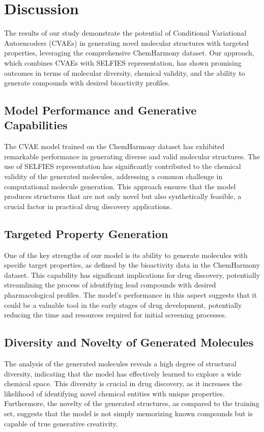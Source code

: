 \section{Discussion}

The results of our study demonstrate the potential of Conditional Variational Autoencoders (CVAEs) in generating novel molecular structures with targeted properties, leveraging the comprehensive ChemHarmony dataset. Our approach, which combines CVAEs with SELFIES representation, has shown promising outcomes in terms of molecular diversity, chemical validity, and the ability to generate compounds with desired bioactivity profiles.

\subsection{Model Performance and Generative Capabilities}

The CVAE model trained on the ChemHarmony dataset has exhibited remarkable performance in generating diverse and valid molecular structures. The use of SELFIES representation has significantly contributed to the chemical validity of the generated molecules, addressing a common challenge in computational molecule generation. This approach ensures that the model produces structures that are not only novel but also synthetically feasible, a crucial factor in practical drug discovery applications.

\subsection{Targeted Property Generation}

One of the key strengths of our model is its ability to generate molecules with specific target properties, as defined by the bioactivity data in the ChemHarmony dataset. This capability has significant implications for drug discovery, potentially streamlining the process of identifying lead compounds with desired pharmacological profiles. The model's performance in this aspect suggests that it could be a valuable tool in the early stages of drug development, potentially reducing the time and resources required for initial screening processes.

\subsection{Diversity and Novelty of Generated Molecules}

The analysis of the generated molecules reveals a high degree of structural diversity, indicating that the model has effectively learned to explore a wide chemical space. This diversity is crucial in drug discovery, as it increases the likelihood of identifying novel chemical entities with unique properties. Furthermore, the novelty of the generated structures, as compared to the training set, suggests that the model is not simply memorizing known compounds but is capable of true generative creativity.

